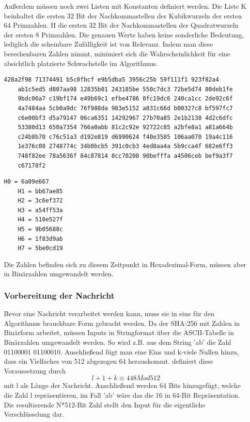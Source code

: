 Außerdem müssen noch zwei Listen mit Konstanten definiert werden. Die Liste K beinhaltet die ersten 32 Bit der Nachkommastellen der Kubikwurzeln der ersten 64 Primzahlen.
H die ersten 32 Bit der Nachkommastellen der Quadratwurzeln der ersten 8 Primzahlen. 
Die genauen Werte haben keine sonderliche Bedeutung, lediglich die scheinbare Zufälligkeit ist von Relevanz. Indem man diese berechenbaren Zahlen nimmt, minimiert sich die Wahrscheinlichkeit für eine absichtlich platzierte Schwachstelle im Algorithmus.
\begin{lstlisting}[caption={Liste K von Konstanten},captionpos=b]
	428a2f98 71374491 b5c0fbcf e9b5dba5 3956c25b 59f111f1 923f82a4 
	ab1c5ed5 d807aa98 12835b01 243185be 550c7dc3 72be5d74 80deb1fe 
	9bdc06a7 c19bf174 e49b69c1 efbe4786 0fc19dc6 240ca1cc 2de92c6f 
	4a7484aa 5cb0a9dc 76f988da 983e5152 a831c66d b00327c8 bf597fc7
	c6e00bf3 d5a79147 06ca6351 14292967 27b70a85 2e1b2138 4d2c6dfc
	53380d13 650a7354 766a0abb 81c2c92e 92722c85 a2bfe8a1 a81a664b 
	c24b8b70 c76c51a3 d192e819 d6990624 f40e3585 106aa070 19a4c116 
	1e376c08 2748774c 34b0bcb5 391c0cb3 4ed8aa4a 5b9cca4f 682e6ff3 
	748f82ee 78a5636f 84c87814 8cc70208 90befffa a4506ceb bef9a3f7 
	c67178f2
\end{lstlisting}
\begin{lstlisting}[caption={Liste H mit den Arbeitsvariablen H0 - H7},captionpos=b]
	H0 = 6a09e667
	H1 = bb67ae85
	H2 = 3c6ef372
	H3 = a54ff53a
	H4 = 510e527f
	H5 = 9b05688c
	H6 = 1f83d9ab
	H7 = 5be0cd19
\end{lstlisting}
Die Zahlen befinden sich zu diesem Zeitpunkt in Hexadezimal-Form, müssen aber in Binärzahlen umgewandelt werden.
\subsubsection{Vorbereitung der Nachricht}
Bevor eine Nachricht verarbeitet werden kann, muss sie in eine für den Algorithmus brauchbare Form gebracht werden. 
Da der SHA-256 mit Zahlen in Binärform arbeitet, müssen Inputs in Stringformat über die ASCII-Tabelle in Binärzahlen umgewandelt werden. So wird z.B. aus dem String 'ab' die Zahl 01100001 01100010.
Anschließend fügt man eine Eins und k-viele Nullen hinzu, dass ein Vielfaches von 512 abgezogen 64 herauskommt. \cite{dang_2015} definiert diese Voraussetzung durch
$$l+1+k \equiv 448 Mod512$$
mit l als Länge der Nachricht. Anschließend werden 64 Bits hinzugefügt, welche die Zahl l repräsentieren, im Fall 'ab' wäre das die 16 in 64-Bit Repräsentation. Die resultierende N*512-Bit Zahl stellt den Input für die eigentliche Verschlüsselung dar.


